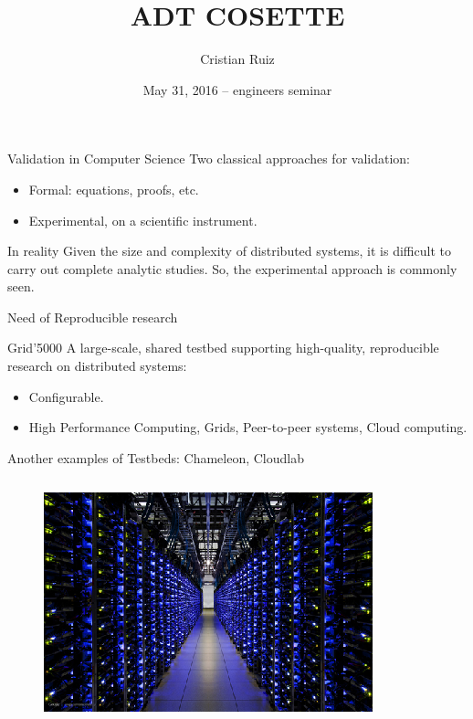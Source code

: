 \documentclass[11pt,xcolor=dvipsnames,presentation]{beamer}
\author{Cristian Ruiz}
\date{May 31, 2016 -- engineers seminar \mylogos}
\title{ADT COSETTE}
\begin{document}
\maketitle


\section{}
\label{sec-1}
\begin{frame}[label=sec-1-0-1]{Validation in Computer Science}
Two classical approaches for validation:

\begin{itemize}
\item \alert{Formal:} equations, proofs, etc.
\item \alert{Experimental}, on a scientific instrument.
\end{itemize}

\begin{block}{In reality}
Given the size and complexity of distributed systems,
it is difficult to carry out complete analytic studies.
\alert{So, the experimental approach is commonly seen}.
\end{block}

\begin{block}{Need of}
\alert{Reproducible research}
\end{block}
\end{frame}

\begin{frame}[label=sec-1-0-2]{Grid'5000}
A large-scale, shared testbed supporting high-quality,
reproducible research on distributed systems:

\begin{itemize}
\item Configurable.
\item High Performance Computing, Grids, Peer-to-peer systems, Cloud computing.
\end{itemize}

Another examples of Testbeds: Chameleon, Cloudlab
\begin{columns}
\begin{column}{0.5\textwidth}

\begin{figure}[!h]
  \center
  \includegraphics[scale=0.33]{figures/hpc.png}
  \label{fig:hpc}
\end{figure}
\end{column}
\end{columns}
\end{frame}
\end{document}

